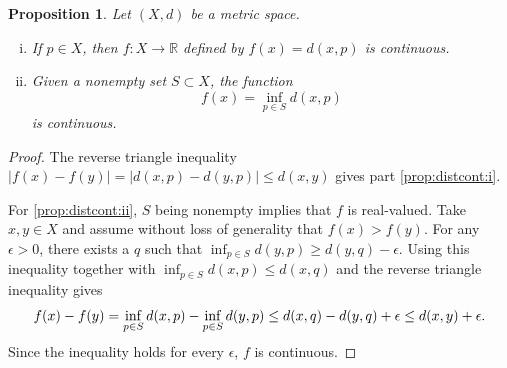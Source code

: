 \documentclass[12pt,openany]{book}
\newcommand{\avoidbreak}{\postdisplaypenalty=100}
\newcommand{\sabs}[1]{\lvert {#1} \rvert}
\newcommand{\R}{{\mathbb{R}}}
\theoremstyle{plain}
\newtheorem{prop}[thm]{Proposition}
\theoremstyle{remark}
\theoremstyle{definition}
\theoremstyle{exercise}
\theoremstyle{example}
\begin{document}
\begin{prop}\label{prop:distcont}
Let $(X,d)$ be a metric space.
\begin{enumerate}[(i)]
\item\label{prop:distcont:i}
If $p \in X$,
then $f \colon X \to \R$ defined
by $f(x) = d(x,p)$ is continuous.
\item\label{prop:distcont:ii}
Given a nonempty set $S \subset X$, the function
\begin{equation*}
f(x) = \inf_{p \in S} d(x,p)
\end{equation*}
is continuous.
\end{enumerate}
\end{prop}

\begin{proof}
The reverse triangle inequality
$\sabs{f(x)-f(y)} = \sabs{d(x,p)-d(y,p)} \leq d(x,y)$
gives part \ref{prop:distcont:i}.

For \ref{prop:distcont:ii}, $S$ being nonempty implies that $f$ is
real-valued.  Take $x,y \in X$ and assume without loss of generality
that $f(x) > f(y)$.
For any $\epsilon > 0$, there exists a $q$ such that
$\inf_{p \in S} d(y,p) \geq d(y,q) - \epsilon$.
Using this inequality together with
$\inf_{p \in S} d(x,p) \leq d(x,q)$ and
the reverse triangle inequality gives
\begin{equation*}
f(x)-f(y) =
\inf_{p \in S} d(x,p)
-
\inf_{p \in S} d(y,p)
\leq
d(x,q) - d(y,q) + \epsilon 
\leq d(x,y) + \epsilon.
\avoidbreak
\end{equation*}
Since the inequality holds for every $\epsilon$, $f$ is continuous.
\end{proof}
\end{document}
